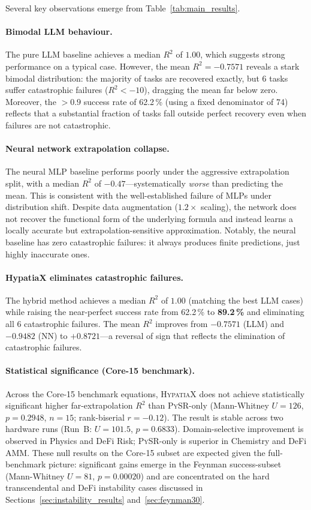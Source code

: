 \documentclass[twoside,11pt]{article}
\newcommand{\Rsq}{R^{2}}
\begin{document}
Several key observations emerge from Table~\ref{tab:main_results}.

\paragraph{Bimodal LLM behaviour.}
The pure LLM baseline achieves a median $\Rsq$ of $1.00$, which suggests strong
performance on a typical case.  However, the mean $\Rsq = -0.7571$ reveals a
stark bimodal distribution: the majority of tasks are recovered exactly, but
6 tasks suffer catastrophic failures ($\Rsq < -10$), dragging the mean far below
zero.  Moreover, the $>0.9$ success rate of 62.2\,\% (using a fixed denominator
of 74) reflects that a substantial fraction of tasks fall outside perfect recovery
even when failures are not catastrophic.

\paragraph{Neural network extrapolation collapse.}
The neural MLP baseline performs poorly under the aggressive extrapolation split,
with a median $\Rsq$ of $-0.47$---systematically \emph{worse} than predicting
the mean.  This is consistent with the well-established failure of MLPs under
distribution shift.  Despite data augmentation ($1.2\times$ scaling), the network
does not recover the functional form of the underlying formula and instead learns
a locally accurate but extrapolation-sensitive approximation.  Notably, the neural
baseline has zero catastrophic failures: it always produces finite predictions,
just highly inaccurate ones.

\paragraph{HypatiaX eliminates catastrophic failures.}
The hybrid method achieves a median $\Rsq$ of $1.00$ (matching the best LLM cases)
while raising the near-perfect success rate from 62.2\,\% to \textbf{89.2\,\%}
and eliminating all 6 catastrophic failures.  The mean $\Rsq$ improves from
$-0.7571$ (LLM) and $-0.9482$ (NN) to $+0.8721$---a reversal of sign that reflects
the elimination of catastrophic failures.

\paragraph{Statistical significance (Core-15 benchmark).}
Across the Core-15 benchmark equations, \textsc{HypatiaX} does not achieve
statistically significant higher far-extrapolation $\Rsq$ than \textsc{PySR}-only
(Mann-Whitney $U=126$, $p=0.2948$, $n=15$; rank-biserial $r=-0.12$).  The result
is stable across two hardware runs (Run~B: $U=101.5$, $p=0.6833$).
Domain-selective improvement is observed in Physics and DeFi Risk;
\textsc{PySR}-only is superior in Chemistry and DeFi AMM.
These null results on the Core-15 subset are expected given the full-benchmark
picture: significant gains emerge in the Feynman success-subset
(Mann-Whitney $U=81$, $p=0.00020$) and are concentrated on the hard transcendental
and DeFi instability cases discussed in Sections~\ref{sec:instability_results}
and~\ref{sec:feynman30}.
\end{document}
